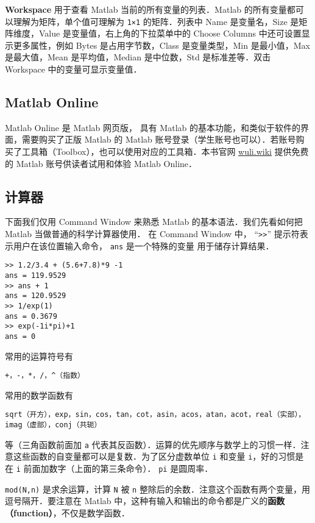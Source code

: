 \textbf{Workspace} 用于查看 Matlab 当前的所有变量的列表．Matlab 的所有变量都可以理解为矩阵，单个值可理解为 \lstinline|1×1| 的矩阵．列表中 Name 是变量名，Size 是矩阵维度，Value 是变量值，右上角的下拉菜单中的 Choose Columns 中还可设置显示更多属性，例如 Bytes 是占用字节数，Class 是变量类型，Min 是最小值，Max 是最大值，Mean 是平均值，Median 是中位数，Std 是标准差等．双击 Workspace 中的变量可显示变量值．

\subsection{Matlab Online}
Matlab Online 是 Matlab 网页版， 具有 Matlab 的基本功能，和类似于软件的界面，需要购买了正版 Matlab 的 Matlab 账号登录（学生账号也可以）．若账号购买了工具箱（Toolbox），也可以使用对应的工具箱．本书官网 \href{http://wuli.wiki}{wuli.wiki} 提供免费的 Matlab 账号供读者试用和体验 Matlab Online．

\subsection{计算器}
下面我们仅用 Command Window 来熟悉 Matlab 的基本语法．我们先看如何把 Matlab 当做普通的科学计算器使用． 在 Command Window 中， “\lstinline|>>|” 提示符表示用户在该位置输入命令， \lstinline|ans| 是一个特殊的变量 用于储存计算结果．
\begin{lstlisting}[language=MatlabCom]
>> 1.2/3.4 + (5.6+7.8)*9 -1
ans = 119.9529
>> ans + 1
ans = 120.9529
>> 1/exp(1)
ans = 0.3679
>> exp(-1i*pi)+1
ans = 0
\end{lstlisting}
常用的运算符号有
\begin{lstlisting}[language=MatlabCom]
+，-，*，/，^（指数）
\end{lstlisting}
常用的数学函数有
\begin{lstlisting}[language=MatlabCom]
sqrt（开方），exp，sin，cos，tan，cot，asin，acos，atan，acot，real（实部），imag（虚部），conj（共轭）
\end{lstlisting}
等（三角函数前面加 \lstinline|a| 代表其反函数）．运算的优先顺序与数学上的习惯一样．注意这些函数的自变量都可以是复数．为了区分虚数单位 \lstinline|i| 和变量 \lstinline|i|，好的习惯是在 \lstinline|i| 前面加数字（上面的第三条命令）． \lstinline|pi| 是圆周率．

\lstinline|mod(N,n)| 是求余运算，计算 \lstinline|N| 被 \lstinline|n| 整除后的余数．注意这个函数有两个变量，用逗号隔开．要注意在 Matlab 中，这种有输入和输出的命令都是广义的\textbf{函数（function）}，不仅是数学函数．

